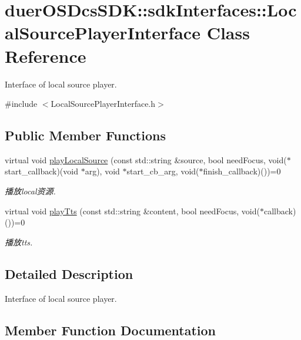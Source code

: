 \hypertarget{classduerOSDcsSDK_1_1sdkInterfaces_1_1LocalSourcePlayerInterface}{}\section{duer\+O\+S\+Dcs\+S\+DK\+:\+:sdk\+Interfaces\+:\+:Local\+Source\+Player\+Interface Class Reference}
\label{classduerOSDcsSDK_1_1sdkInterfaces_1_1LocalSourcePlayerInterface}


Interface of local source player.  




{\ttfamily \#include $<$Local\+Source\+Player\+Interface.\+h$>$}

\subsection*{Public Member Functions}
\begin{DoxyCompactItemize}
\item 
virtual void \hyperlink{classduerOSDcsSDK_1_1sdkInterfaces_1_1LocalSourcePlayerInterface_a431411441e84ce2cf6e1beb3a1e9b92e}{play\+Local\+Source} (const std\+::string \&source, bool need\+Focus, void($\ast$start\+\_\+callback)(void $\ast$arg), void $\ast$start\+\_\+cb\+\_\+arg, void($\ast$finish\+\_\+callback)())=0
\begin{DoxyCompactList}\small\item\em 播放local资源. \end{DoxyCompactList}\item 
virtual void \hyperlink{classduerOSDcsSDK_1_1sdkInterfaces_1_1LocalSourcePlayerInterface_add348d72e87c2bcb4c7fbdd91fc4f590}{play\+Tts} (const std\+::string \&content, bool need\+Focus, void($\ast$callback)())=0
\begin{DoxyCompactList}\small\item\em 播放tts. \end{DoxyCompactList}\end{DoxyCompactItemize}


\subsection{Detailed Description}
Interface of local source player. 

\subsection{Member Function Documentation}
\mbox{\label{classduerOSDcsSDK_1_1sdkInterfaces_1_1LocalSourcePlayerInterface_a431411441e84ce2cf6e1beb3a1e9b92e}} 
